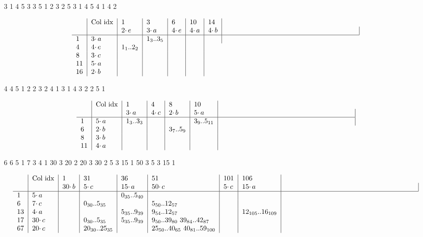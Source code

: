 \documentclass{article}
\begin{document}
3 1   4 5   3 3   5 1   2 3
2 5   3 1   4 5   4 1   4 2


\[ \begin{tabular} {l | l | *{5}{l|} p{66mm} | }
& Col idx & 1 & 3 & 6 & 10 & 14   \\
 & & $2 \cdotp e$ & $3 \cdotp a$ & $4 \cdotp e$ & $4 \cdotp a$ & $4 \cdotp b$ &    \\
\hline 
1 & $3 \cdotp a$  &   & $1_{3}$..$3_{5}$   &     &   &    \\
4 & $4 \cdotp e$  & $1_{1}$..$2_{2}$  &     &   &    \\
8 & $3 \cdotp c$  &   &     &   &    \\
11 & $5 \cdotp a$  &   &     &   &    \\
16 & $2 \cdotp b$  &   &     &   &    \\
\end{tabular} \]

4 4
5 1    2 2    3 2     4 1
3 1    4 3    2 2     5 1

\[ \begin{tabular} {l | l | *{4}{l|} p{66mm} | }
& Col idx & 1 & 4 & 8 & 10    \\
 & & $3 \cdotp a$ & $4 \cdotp c$ & $2 \cdotp b$ & $5 \cdotp a$  &    \\
\hline 
1 & $5 \cdotp a$  &  $1_{3}$..$3_{3}$  &   &     &  $3_{9}$..$5_{11}$  &    \\
6 & $2 \cdotp b$  &   &     & $3_{7}$..$5_{9}$  &    \\
8 & $3 \cdotp b$  &   &     &   &    \\
11 & $4 \cdotp a$  &   &     &   &    \\
\end{tabular} \]

6 6
5 1   7 3    4 1    30 3    20 2    20 3         
30 2  5 3    15 1   50 3    5  3    15 1




\[ \begin{tabular} {l | l | *{6}{l|} p{66mm} | }
& Col idx & 1 & 31 & 36 & 51 & 101 & 106    \\
 & & $30 \cdotp b$ & $5 \cdotp c$ & $15 \cdotp a$ & $50 \cdotp c$  & $5 \cdotp c$  & $15 \cdotp a$  &  \\
\hline 
1 & $5 \cdotp a$  &    &   &  $0_{35}$..$5_{40}$   &    &   & \\
6 & $7 \cdotp c$  &   & $0_{30}$..$5_{35}$    &   & $5_{50}$..$12_{57}$ & &   \\
13 & $4 \cdotp a$  &   &     &  $5_{35}$..$9_{39}$ &  $9_{54}$..$12_{57}$  &   & $12_{105}$..$16_{109}$  \\
17 & $30 \cdotp c$  &   & $0_{30}$..$5_{35}$    & $5_{35}$..$9_{39}$  &  $9_{50}$..$39_{80}$  $39_{84}$..$42_{87}$  &   & \\
67 & $20 \cdotp c$  &   &  $20_{30}$..$25_{35}$    &   &  $25_{50}$..$40_{65}$  $40_{81}$..$59_{100}$      &   & \\
\end{tabular} \]
\end{document}
